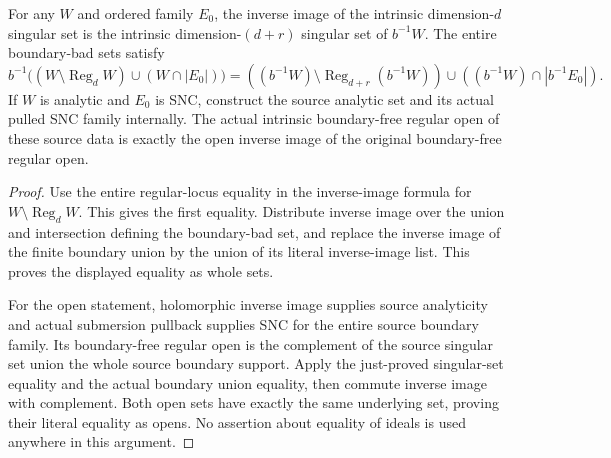 \begin{theorem}
\label{hir:original-smooth-intrinsic-singular-boundary-good}
\leanok
For any $W$ and ordered family $E_0$, the inverse image of the intrinsic
dimension-$d$ singular set is the intrinsic dimension-$(d+r)$ singular
set of $b^{-1}W$.  The entire boundary-bad sets satisfy
\[
 b^{-1}\bigl((W\setminus\operatorname{Reg}_dW)\cup(W\cap|E_0|)\bigr)
 =((b^{-1}W)\setminus\operatorname{Reg}_{d+r}(b^{-1}W))
     \cup((b^{-1}W)\cap|b^{-1}E_0|).
\]
If $W$ is analytic and $E_0$ is SNC, construct the source analytic set
and its actual pulled SNC family internally.  The actual intrinsic
boundary-free regular open of these source data is exactly the open
inverse image of the original boundary-free regular open.
\end{theorem}
\begin{proof}
Use the entire regular-locus equality in the inverse-image formula for
$W\setminus\operatorname{Reg}_dW$.  This gives the first equality.
Distribute inverse image over the union and intersection defining the
boundary-bad set, and replace the inverse image of the finite boundary
union by the union of its literal inverse-image list.  This proves the
displayed equality as whole sets.

For the open statement, holomorphic inverse image supplies source
analyticity and actual submersion pullback supplies SNC for the entire
source boundary family.  Its boundary-free regular open is the
complement of the source singular set union the whole source boundary
support.  Apply the just-proved singular-set equality and the actual
boundary union equality, then commute inverse image with complement.
Both open sets have exactly the same underlying set, proving their
literal equality as opens.  No assertion about equality of ideals is
used anywhere in this argument.
\end{proof}

